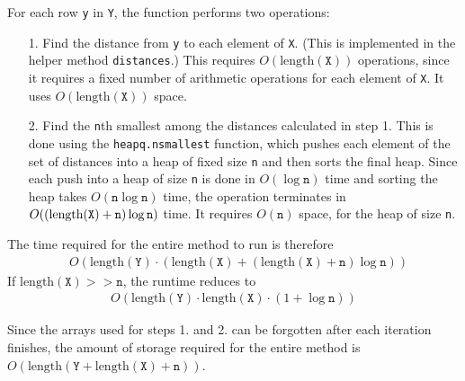 \documentclass{amsart}
\theoremstyle{definition}
\theoremstyle{definition}
\begin{document}
For each row \texttt{y} in \texttt{Y}, the function performs two operations:
\begin{itemize}
\item[1.] Find the distance from \texttt{y} to each element of \texttt{X}.  (This is implemented in the helper method \texttt{distances}.)  This requires $O(\mbox{length}(\texttt{X}))$ operations, since it requires a fixed number of arithmetic operations for each element of \texttt{X}.  It uses $O(\mbox{length}(\texttt{X}))$ space.
\item[2.] Find the \texttt{n}th smallest among the distances calculated in step 1.  This is done using the \texttt{heapq.nsmallest} function, which pushes each element of the set of distances into a heap of fixed size \texttt{n} and then sorts the final heap.  Since each push into a heap of size \texttt{n} is done in $O(\log \texttt{n})$ time and sorting the heap takes $O(\texttt{n}\log \texttt{n})$ time, the operation terminates in $O((\mbox{length(\texttt{X})}+\texttt{n})\log \texttt{n})$ time.  It requires $O(\texttt{n})$ space, for the heap of size \texttt{n}.
\end{itemize}
The time required for the entire method to run is therefore
\begin{align*}
  & O(\mbox{length}(\texttt{Y})\cdot (\mbox{length}(\texttt{X}) + (\mbox{length}(\texttt{X})+\texttt{n})\log \texttt{n}))
\end{align*}
If $\mbox{length}(\texttt{X}) >> \texttt{n}$, the runtime reduces to
\begin{align}
  O(\mbox{length}(\texttt{Y})\cdot \mbox{length}(\texttt{X}) \cdot (1+\log \texttt{n}))\label{performance}
\end{align}

Since the arrays used for steps 1. and 2. can be forgotten after each iteration finishes, the amount of storage required for the entire method is $O(\mbox{length}(\texttt{Y} + \mbox{length}(\texttt{X}) + \texttt{n}))$.
\end{document}
